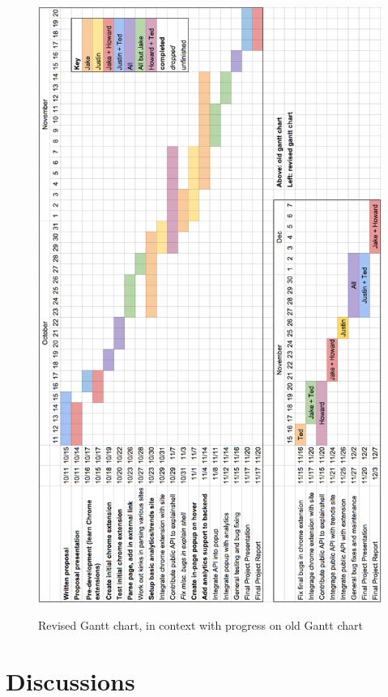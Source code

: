 \documentclass[11pt]{article}
\begin{document}
\begin{center}
  \begin{figure}[h!]
    \includegraphics[height=0.95\textheight, keepaspectratio]{../../gantt-chart-revised-rotated}
    \label{gantt-revised}
    \caption{Revised Gantt chart, in context with progress on old Gantt chart}
  \end{figure}
\end{center}

\section{Discussions}
\end{document}
